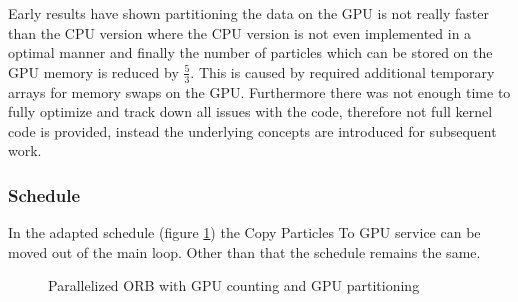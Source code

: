 \documentclass[]{article}
\begin{document}
Early results have shown partitioning the data on the GPU is not really faster than the CPU version where the CPU version is not even implemented in a optimal manner and finally the number of particles which can be stored on the GPU memory is reduced by $\frac{5}{3}$. This is caused by required additional temporary arrays for memory swaps on the GPU. Furthermore there was not enough time to fully optimize and track down all issues with the code, therefore not full kernel code is provided, instead the underlying concepts are introduced for subsequent work. 

\subsubsection{Schedule}

In the adapted schedule (figure \ref{fig:orbgpu3}) the Copy Particles To GPU service can be moved out of the main loop. Other than that the schedule remains the same. 

\begin{figure}[H]
	\begin{center}
	\end{center}
	\caption{Parallelized ORB with GPU counting and GPU partitioning}
	\label{fig:orbgpu3}
\end{figure}
\end{document}
